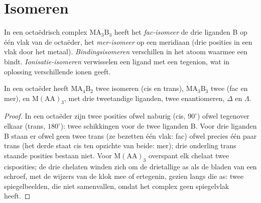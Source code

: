 \section{Isomeren}

\begin{definition}\label{def:b2:coordination-complexes:isomers}
In een octaëdrisch complex $\mathrm{MA_3B_3}$ heeft het \emph{fac-isomeer}
de drie liganden B op één vlak van de octaëder, het \emph{mer-isomeer}
op een meridiaan (drie posities in een vlak door het
metaal). \emph{Bindingsisomeren} verschillen in het atoom waarmee
een  bindt. \emph{Ionisatie-isomeren}
verwisselen een ligand met een tegenion, wat in oplossing verschillende ionen geeft.
\end{definition}

\begin{proposition}\label{prop:b2:coordination-complexes:isomer-count}
In een octaëder heeft $\mathrm{MA_4B_2}$ twee isomeren (cis en trans), $\mathrm{MA_3B_3}$ twee
(fac en mer), en $\mathrm M(\mathrm{AA})_3$, met drie tweetandige liganden, twee
enantiomeren, $\Delta$ en $\Lambda$.
\end{proposition}

\begin{proof}
In een octaëder zijn twee posities ofwel naburig (cis, $90^\circ$) ofwel tegenover elkaar
(trans, $180^\circ$): twee schikkingen voor de twee liganden B. Voor drie liganden B
staan er ofwel geen twee trans (ze bezetten één vlak: fac) ofwel precies één paar trans (het
derde staat cis ten opzichte van beide: mer); drie onderling trans staande posities bestaan niet. Voor
$\mathrm M(\mathrm{AA})_3$ overspant elk chelaat twee cisposities; de drie chelaten
winden zich om de drietallige as als de bladen van een schroef, met de wijzers van de klok mee
of ertegenin, gezien langs die as: twee spiegelbeelden, die niet samenvallen,
omdat het complex geen spiegelvlak heeft.
\end{proof}

